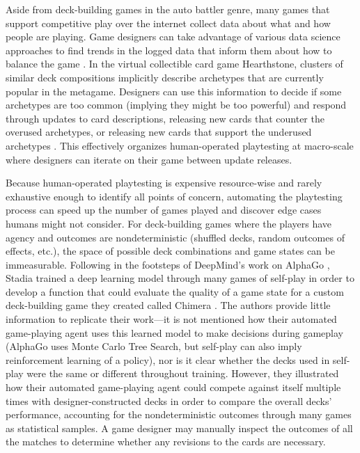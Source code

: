 Aside from deck-building games in the auto battler genre, many games that support competitive
play over the internet collect data about what and how people are playing.  Game
designers can take advantage of various data science approaches to find trends in
the logged data that inform them about how to balance the game \cite{nce-gameAIpro2}.
In the virtual collectible card game Hearthstone, clusters of similar deck
compositions implicitly describe archetypes that are currently popular in the
metagame.  Designers can use this information to decide if some archetypes are too
common (implying they might be too powerful) and respond through updates to card
descriptions, releasing new cards that counter the overused archetypes, or
releasing new cards that support the underused archetypes \cite{blizzard-gamebalancetalk-keg2019}.
This effectively organizes human-operated playtesting at macro-scale where designers
can iterate on their game between update releases.

Because human-operated playtesting is expensive resource-wise and rarely
exhaustive enough to identify all points of concern, automating the playtesting
process can speed up the number of games played and discover edge cases humans
might not consider.  For deck-building games where the players have
agency and outcomes are nondeterministic (shuffled decks, random outcomes of effects,
etc.), the space of possible deck combinations and game states can be immeasurable.
Following in the footsteps of DeepMind's work on AlphaGo \cite{alphago}, Stadia
trained a deep learning model through many games of self-play in order to develop
a function that could evaluate the quality of a game state for a custom deck-building
game they created called Chimera \cite{chimera-mlagent}.  The authors provide
little information to replicate their work---it is not mentioned how their automated
game-playing agent uses this learned model to make decisions during gameplay
(AlphaGo uses Monte Carlo Tree Search, but self-play can also imply reinforcement
learning of a policy), nor is it clear whether the decks used in self-play were
the same or different throughout training.  However, they illustrated how their
automated game-playing agent could compete against itself multiple times with
designer-constructed decks in order to compare the overall decks' performance,
accounting for the nondeterministic outcomes through many games as statistical
samples.  A game designer may manually inspect the outcomes of all the matches
to determine whether any revisions to the cards are necessary.

